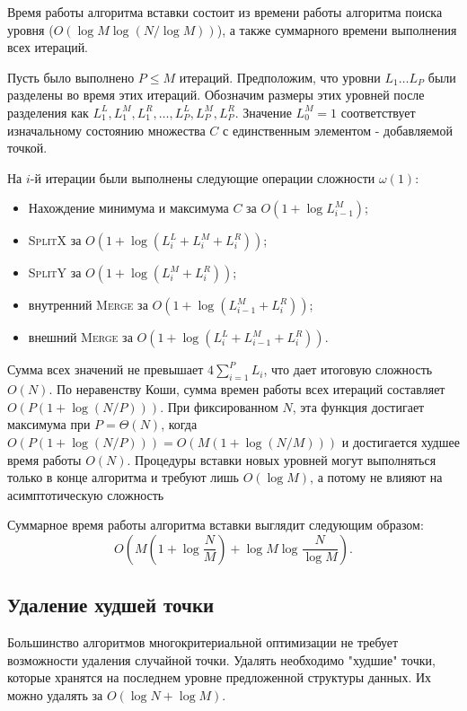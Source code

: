 Время работы алгоритма вставки состоит из времени работы алгоритма поиска уровня 
($O(\log M \log (N / \log M))$), а также суммарного времени выполнения всех итераций.

Пусть было выполнено $P \le M$ итераций. Предположим, что уровни $L_1 \ldots L_P$ 
были разделены во время этих итераций. Обозначим размеры этих уровней после разделения как
$L_1^L, L_1^M, L_1^R, \ldots, L_P^L, L_P^M, L_P^R$. Значение $L_0^M = 1$ соответствует 
изначальному состоянию множества $C$ с единственным элементом - добавляемой точкой.

На $i$-й итерации были выполнены следующие операции сложности $\omega(1)$:
\begin{itemize}
    \item Нахождение минимума и максимума $C$ за $O(1 + \log L_{i-1}^M)$;
    \item \textsc{SplitX} за $O(1 + \log(L_i^L + L_i^M + L_i^R))$;
    \item \textsc{SplitY} за $O(1 + \log(L_i^M + L_i^R))$;
    \item внутренний \textsc{Merge} за $O(1 + \log(L_{i-1}^M + L_i^R))$;
    \item внешний \textsc{Merge} за $O(1 + \log(L_i^L + L_{i-1}^M + L_i^R))$.
\end{itemize}

Сумма всех значений не превышает $4 \sum_{i=1}^{P}{L_i}$, что дает итоговую сложность $O(N)$. 
По неравенству Коши, сумма времен работы всех итераций составляет $O(P (1 + \log (N/P)))$. 
При фиксированном $N$, эта функция достигает максимума при $P = \Theta(N)$,
когда $O(P (1 + \log(N/P))) = O(M(1+ \log(N/M)))$ и достигается худшее время работы $O(N)$. 
Процедуры вставки новых уровней могут выполняться только в конце алгоритма и требуют лишь $O(\log M)$,
а потому не влияют на асимптотическую сложность

Суммарное время работы алгоритма вставки выглядит следующим образом:
$$O\left(M \left(1 + \log\frac{N}{M}\right) + \log M \log \frac{N}{\log M}\right).$$

\subsection{Удаление худшей точки}
\label{algo-delete}
Большинство алгоритмов многокритериальной оптимизации не требует возможности удаления случайной точки.
Удалять необходимо "худшие" точки, которые хранятся на последнем уровне предложенной структуры данных.
Их можно удалять за $O(\log N + \log M)$.